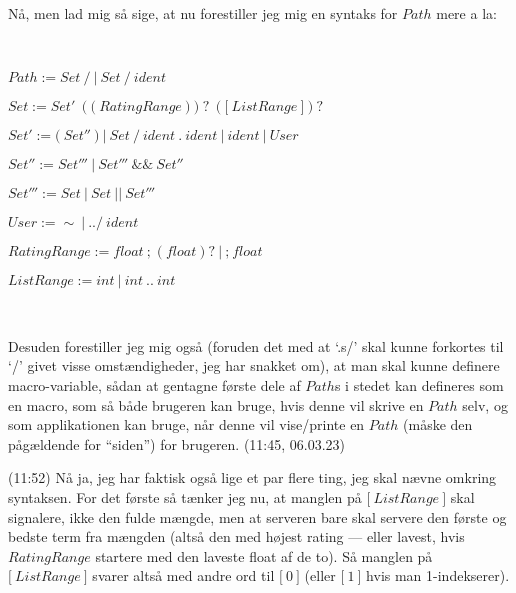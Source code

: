 \documentclass{report}
\begin{document}
Nå, men lad mig så sige, at nu forestiller jeg mig en syntaks for $Path$ mere a la:



\ 

$Path :=  Set\ \texttt{/}\ |\ Set\ \texttt{/}\ ident$


$Set := Set'\ (\texttt{(}\ RatingRange\ \texttt{)})?\ (\texttt{[}\ ListRange\ \texttt{]})? 
$ 

$Set' := \texttt{(}\ Set''\ \texttt{)}\ |\ 
	Set\ \texttt{/}\ ident\ \texttt{.}\ ident\ |\ 
	ident\ |\ 
	User
$ 

$Set'' := Set'''\ |\ Set'''\ \texttt{\&\&}\ Set''$ 

$Set''' := Set\ |\ Set\ \texttt{||}\ Set'''$ 


$User := \mathtt{\sim}\ |\ \texttt{../}\ ident$ 

$RatingRange := float\ \texttt{;}\ (float)?\ |\ \texttt{;}\ float$

$ListRange := int\ |\ int\ \texttt{..}\ int$

\ 

Desuden forestiller jeg mig også (foruden det med at `.s/' skal kunne forkortes til `/' givet visse omstændigheder, jeg har snakket om), at man skal kunne definere macro-variable, sådan at gentagne første dele af $Path$s i stedet kan defineres som en macro, som så både brugeren kan bruge, hvis denne vil skrive en $Path$ selv, og som applikationen kan bruge, når denne vil vise/printe en $Path$ (måske den pågældende for ``siden'') for brugeren. (11:45, 06.03.23)

(11:52) Nå ja, jeg har faktisk også lige et par flere ting, jeg skal nævne omkring syntaksen. For det første så tænker jeg nu, at manglen på $\texttt{[}\ ListRange\ \texttt{]}$ skal signalere, ikke den fulde mængde, men at serveren bare skal servere den første og bedste term fra mængden (altså den med højest rating --- eller lavest, hvis $RatingRange$ startere med den laveste float af de to). Så manglen på $\texttt{[}\ ListRange\ \texttt{]}$ svarer altså med andre ord til $\texttt{[}\ 0\ \texttt{]}$ (eller $\texttt{[}\ 1\ \texttt{]}$ hvis man 1-indekserer). 
\end{document}
